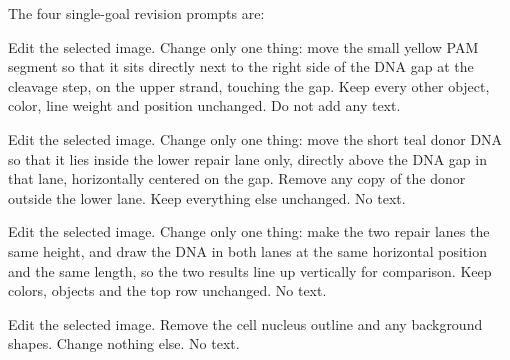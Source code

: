 The four single-goal revision prompts are:

\begin{Prompt}
 Edit the selected image. Change only one thing: move the small yellow PAM segment so that it sits directly next to the right side of the DNA gap at the cleavage step, on the upper strand, touching the gap. Keep every other object, color, line weight and position unchanged. Do not add any text.
\end{Prompt}

\begin{Prompt}
 Edit the selected image. Change only one thing: move the short teal donor DNA so that it lies inside the lower repair lane only, directly above the DNA gap in that lane, horizontally centered on the gap. Remove any copy of the donor outside the lower lane. Keep everything else unchanged. No text.
\end{Prompt}

\begin{Prompt}
 Edit the selected image. Change only one thing: make the two repair lanes the same height, and draw the DNA in both lanes at the same horizontal position and the same length, so the two results line up vertically for comparison. Keep colors, objects and the top row unchanged. No text.
\end{Prompt}

\begin{Prompt}
 Edit the selected image. Remove the cell nucleus outline and any background shapes. Change nothing else. No text.
\end{Prompt}

